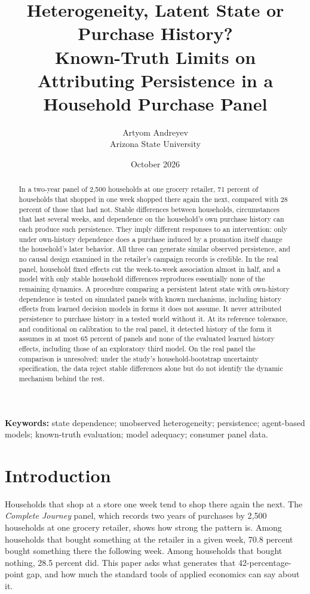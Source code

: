 \documentclass[11pt]{article}
\title{Heterogeneity, Latent State or Purchase History?\\[2pt]
\large Known-Truth Limits on Attributing Persistence in a Household Purchase Panel}
\author{Artyom Andreyev\\ \small Arizona State University}
\date{\small October 2026}
\begin{document}
\maketitle

\begin{abstract}
\noindent In a two-year panel of 2,500 households at one grocery retailer, 71 percent of
households that shopped in one week shopped there again the next, compared with 28 percent of
those that had not. Stable differences between households, circumstances that last
several weeks, and dependence on the household's own purchase history can each produce such
persistence. They imply different responses to an intervention: only under own-history
dependence does a purchase induced by a promotion itself change the household's later behavior.
All three can generate similar observed persistence, and no causal design examined in the retailer's campaign
records is credible. In the real panel, household fixed effects cut the week-to-week association
almost in half, and a model with only stable household differences reproduces essentially none
of the remaining dynamics. A procedure comparing a persistent latent state with own-history
dependence is tested on simulated panels with known mechanisms, including history effects from
learned decision models in forms it does not assume. It never attributed persistence to
purchase history in a tested world without it. At its reference tolerance, and conditional on
calibration to the real panel, it detected history of the form it assumes in at most 65 percent
of panels and none of the evaluated learned history effects, including those of an exploratory
third model. On the real panel the comparison is unresolved: under the study's household-bootstrap
uncertainty specification, the data reject stable differences alone but do not identify the
dynamic mechanism behind the rest.
\end{abstract}

\medskip
\noindent\textbf{Keywords:} state dependence; unobserved heterogeneity; persistence;
agent-based models; known-truth evaluation; model adequacy; consumer panel data.

\section{Introduction}
\label{sec:intro}

Households that shop at a store one week tend to shop there again the next. The
\emph{Complete Journey} panel, which records two years of purchases by 2,500 households at
one grocery retailer, shows how strong the pattern is. Among households that bought
something at the retailer in a given week, 70.8 percent bought something there the following
week. Among households that bought nothing, 28.5 percent did. This paper asks what generates
that 42-percentage-point gap, and how much the standard tools of applied economics can say
about it.
\end{document}
